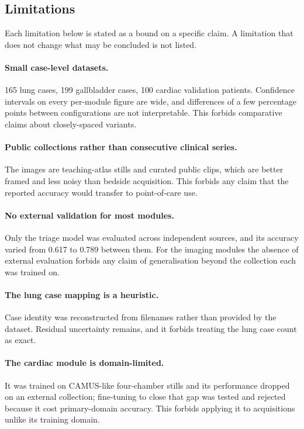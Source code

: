 \subsection{Limitations}
\label{subsec:results-limitations}

Each limitation below is stated as a bound on a specific claim. A limitation that does not
change what may be concluded is not listed.

\paragraph{Small case-level datasets.} 165 lung cases, 199 gallbladder cases, 100 cardiac
validation patients. Confidence intervals on every per-module figure are wide, and differences
of a few percentage points between configurations are not interpretable. This forbids
comparative claims about closely-spaced variants.

\paragraph{Public collections rather than consecutive clinical series.} The images are
teaching-atlas stills and curated public clips, which are better framed and less noisy than
bedside acquisition. This forbids any claim that the reported accuracy would transfer to
point-of-care use.

\paragraph{No external validation for most modules.} Only the triage model was evaluated
across independent sources, and its accuracy varied from 0.617 to 0.789 between them. For the
imaging modules the absence of external evaluation forbids any claim of generalisation beyond
the collection each was trained on.

\paragraph{The lung case mapping is a heuristic.} Case identity was reconstructed from
filenames rather than provided by the dataset. Residual uncertainty remains, and it forbids
treating the lung case count as exact.

\paragraph{The cardiac module is domain-limited.} It was trained on CAMUS-like four-chamber
stills and its performance dropped on an external collection; fine-tuning to close that gap
was tested and rejected because it cost primary-domain accuracy. This forbids applying it to
acquisitions unlike its training domain.

